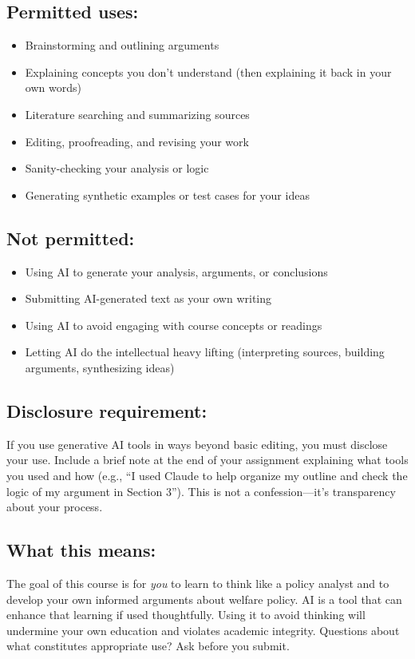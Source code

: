 \documentclass[12pt]{article}
\begin{document}
\subsection*{Permitted uses:}
\begin{itemize}
\item Brainstorming and outlining arguments
\item Explaining concepts you don't understand (then explaining it back in your own words)
\item Literature searching and summarizing sources
\item Editing, proofreading, and revising your work
\item Sanity-checking your analysis or logic
\item Generating synthetic examples or test cases for your ideas
\end{itemize}

\subsection*{Not permitted:}
\begin{itemize}
\item Using AI to generate your analysis, arguments, or conclusions
\item Submitting AI-generated text as your own writing
\item Using AI to avoid engaging with course concepts or readings
\item Letting AI do the intellectual heavy lifting (interpreting sources, building arguments, synthesizing ideas)
\end{itemize}

\subsection*{Disclosure requirement:}
If you use generative AI tools in ways beyond basic editing, you must disclose your use. Include a brief note at the end of your assignment explaining what tools you used and how (e.g., ``I used Claude to help organize my outline and check the logic of my argument in Section 3''). This is not a confession—it's transparency about your process.

\subsection*{What this means:}
The goal of this course is for \emph{you} to learn to think like a policy analyst and to develop your own informed arguments about welfare policy. AI is a tool that can enhance that learning if used thoughtfully. Using it to avoid thinking will undermine your own education and violates academic integrity. Questions about what constitutes appropriate use? Ask before you submit.
\end{document}
